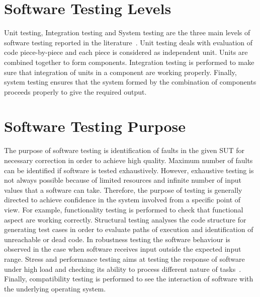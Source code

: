 \section{Software Testing Levels}
Unit testing, Integration testing and System testing are the three main levels of software testing reported in the literature~\cite{chilenski1994applicability}. Unit testing deals with evaluation of code piece-by-piece and each piece is considered as independent unit. Units are combined together to form components. Integration testing is performed to make sure that integration of units in a component are working properly. Finally, system testing ensures that the system formed by the combination of components proceeds properly to give the required output.

\section{Software Testing Purpose}
The purpose of software testing is identification of faults in the given SUT for necessary correction in order to achieve high quality. Maximum number of faults can be identified if software is tested exhaustively. However, exhaustive testing is not always possible because of limited resources and infinite number of input values that a software can take. Therefore, the purpose of testing is generally directed to achieve confidence in the system involved from a specific point of view. For example, functionality testing is performed to check that functional aspect are working correctly. Structural testing analyses the code structure for generating test cases in order to evaluate paths of execution and identification of unreachable or dead code. In robustness testing the software behaviour is observed in the case when software receives input outside the expected input range. Stress and performance testing aims at testing the response of software under high load and checking its ability to process different nature of tasks~\cite{cohen2005robustness}. Finally, compatibility testing is performed to see the interaction of software with the underlying operating system.


